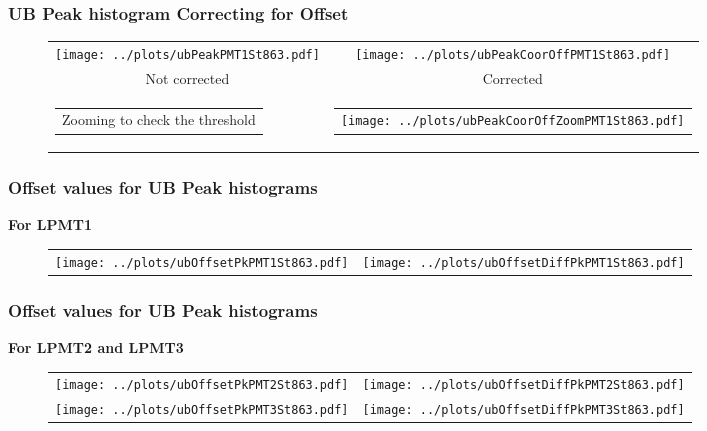 \documentclass[aspectratio=169]{beamer}
\begin{document}
\begin{frame}
	\frametitle{UB Peak histogram Correcting for Offset}
	
	\begin{figure}
		\centering
		\begin{tabularx}{\textwidth}{CC}
			\texttt{[image: ../plots/ubPeakPMT1St863.pdf]}
			&
			\texttt{[image: ../plots/ubPeakCoorOffPMT1St863.pdf]}
			\\
			Not corrected & Corrected
			\\
			\begin{tabular}{l}
				Zooming to check the threshold
			\end{tabular}
			&
			\begin{tabular}{l}
				\texttt{[image: ../plots/ubPeakCoorOffZoomPMT1St863.pdf]}
			\end{tabular}
		\end{tabularx}
	\end{figure}
\end{frame}



\begin{frame}
	\frametitle{Offset values for UB Peak histograms}
	{\bf For LPMT1}
	\begin{figure}
		\centering
		\begin{tabularx}{\textwidth}{CC}
			\texttt{[image: ../plots/ubOffsetPkPMT1St863.pdf]}
			&
			\texttt{[image: ../plots/ubOffsetDiffPkPMT1St863.pdf]}
		\end{tabularx}
	\end{figure}
\end{frame}
			
			
\begin{frame}
	\frametitle{Offset values for UB Peak histograms}
	{\bf For LPMT2 and LPMT3}
	\begin{figure}
		\centering
		\begin{tabularx}{\textwidth}{CC}
			\texttt{[image: ../plots/ubOffsetPkPMT2St863.pdf]}
			&
			\texttt{[image: ../plots/ubOffsetDiffPkPMT2St863.pdf]}
			\\
			\texttt{[image: ../plots/ubOffsetPkPMT3St863.pdf]}
			&
			\texttt{[image: ../plots/ubOffsetDiffPkPMT3St863.pdf]}
		\end{tabularx}
	\end{figure}
\end{frame}


\end{document}
